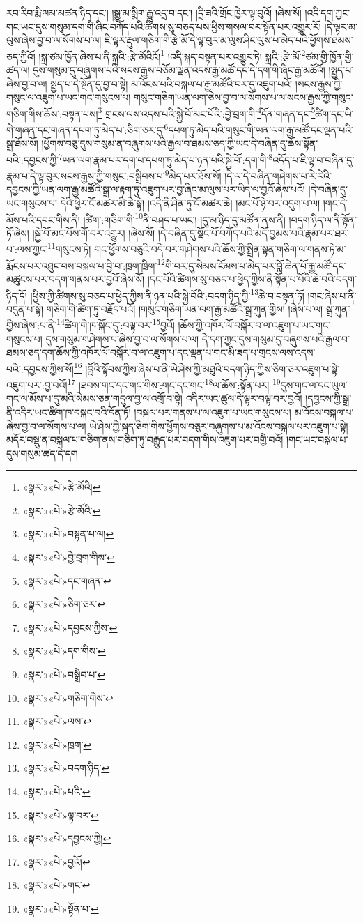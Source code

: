 རབ་རིབ་རྨི་ལམ་མཚན་ཉིད་དང་། །སྒྱུ་མ་སྨིག་རྒྱུ་འདྲ་བ་དང་། །དྲི་ཟའི་གྲོང་ཁྱེར་ལྟ་བུའོ། །ཞེས་སོ། །འདི་དག་ཀྱང་གང་ཡང་དུས་གསུམ་དག་གི་ཞིང་བཀོད་པའི་ཚིགས་སུ་བཅད་པས་ཕྱིས་གསལ་བར་སྟོན་པར་འགྱུར་རོ། །དེ་ལྟར་མ་ལུས་ཞེས་བྱ་བ་ལ་སོགས་པ་ལ། ཇི་ལྟར་རྡུལ་གཅིག་གི་རྩེ་མོ་དེ་ལྟ་བུར་མ་ལུས་ཤིང་ལུས་པ་མེད་པའི་ཕྱོགས་ཐམས་ཅད་ཀྱིའོ། །སྐྲ་ཙམ་ཁྱོན་ཞེས་པ་ནི་སྐྲའི་:རྩེ་མོའིའོ།\footnote{«སྣར་»«པེ་»རྩེ་མོའི།} །འདི་སྐད་བསྟན་པར་འགྱུར་ཏེ། སྐྲའི་:རྩེ་མོ་\footnote{«སྣར་»«པེ་»རྩེ་མོའི་}ཙམ་གྱི་ཁྱོན་གྱི་ཚད་ལ། དུས་གསུམ་དུ་བཞུགས་པའི་སངས་རྒྱས་བཅོམ་ལྡན་འདས་རྒྱ་མཚོ་དང་དེ་དག་གི་ཞིང་རྒྱ་མཚོའོ། །སྤྱད་པ་ཞེས་བྱ་བ་ལ། སྤྱད་པ་དེ་སྔོན་དུ་བྱ་བ་སྟེ། མ་འོངས་པའི་བསྐལ་པ་རྒྱ་མཚོའི་བར་དུ་འཇུག་པའོ། །སངས་རྒྱས་ཀྱི་གསུང་ལ་འཇུག་པ་ཡང་གང་གསུངས་པ། གསུང་གཅིག་ཡན་ལག་ཅེས་བྱ་བ་ལ་སོགས་པ་ལ་སངས་རྒྱས་ཀྱི་གསུང་གཅིག་གིས་ཆོས་:བསྟན་པས།\footnote{«སྣར་»«པེ་»བསྟན་པ་ལ།} གྲངས་ལས་འདས་པའི་སྐྱེ་བོ་མང་པོའི་:བྱེ་བྲག་གི་\footnote{«སྣར་»«པེ་»བྱེ་བྲག་གིས་}དོན་གཞན་དང་\footnote{«སྣར་»«པེ་»དང་གཞན་}ཚིག་དང་ཡི་གེ་གཞན་དང་གཞན་དཔག་ཏུ་མེད་པ་:ཅིག་ཅར་དུ་\footnote{«སྣར་»«པེ་»ཅིག་ཅར་}དཔག་ཏུ་མེད་པའི་གསུང་གི་ཡན་ལག་རྒྱ་མཚོ་དང་ལྡན་པའི་སྒྲ་ཐོས་སོ། །ཕྱོགས་བཅུ་དུས་གསུམ་ན་བཞུགས་པའི་རྒྱལ་བ་ཐམས་ཅད་ཀྱི་ཡང་དེ་བཞིན་དུ་ཆོས་སྟོན་པའི་:དབྱངས་ཀྱི་\footnote{«སྣར་»«པེ་»དབྱངས་ཀྱིས་}ཡན་ལག་རྣམ་པར་དག་པ་དཔག་ཏུ་མེད་པ་ཉན་པའི་སྐྱེ་བོ་:དག་གི་\footnote{«སྣར་»«པེ་»དག་གིས་}འདོད་པ་ཇི་ལྟ་བ་བཞིན་དུ་རྣམ་པ་དེ་ལྟ་བུར་སངས་རྒྱས་ཀྱི་གསུང་:བསྒྲིབས་པ་\footnote{«སྣར་»«པེ་»བསྒྲིབ་པ་}མེད་པར་ཐོས་སོ། །དེ་ལ་དེ་བཞིན་གཤེགས་པ་རེ་རེའི་དབྱངས་ཀྱི་ཡན་ལག་རྒྱ་མཚོའི་སྒྲ་ལ་རྟག་ཏུ་འཇུག་པར་བྱ་ཞིང་མ་ལུས་པར་ཡིད་ལ་བྱའོ་ཞེས་པའོ། །དེ་བཞིན་དུ་ཡང་གསུངས་པ། དེའི་ཕྱིར་ངོ་མཚར་མི་ཆེ་སྟེ། །འདི་ནི་ཤིན་ཏུ་ངོ་མཚར་ཆེ། །མང་པོ་ཉེ་བར་འདུག་པ་ལ། །གང་དེ་མོས་པའི་དབང་གིས་ནི། །ཚིག་:གཅིག་གི་\footnote{«སྣར་»«པེ་»གཅིག་གིས་}ནི་བཤད་པ་ཡང་། །དུ་མ་ཉིད་དུ་མཚོན་ནས་ནི། །བདག་ཉིད་ལ་ནི་སྟོན་ཏོ་ཞེས། །སྐྱེ་བོ་མང་པོས་གོ་བར་འགྱུར། །ཞེས་སོ། །དེ་བཞིན་དུ་སྡོང་པོ་བཀོད་པའི་མདོ་བྱམས་པའི་རྣམ་པར་ཐར་པ་:ལས་ཀྱང་\footnote{«སྣར་»«པེ་»ལས་}གསུངས་ཏེ། གང་ཕྱོགས་བཅུའི་བདེ་བར་གཤེགས་པའི་ཆོས་ཀྱི་སྤྲིན་སྟན་གཅིག་ལ་གནས་ཏེ་མ་རྨོངས་པར་འཐུང་བས་བསྐལ་པ་བྱེ་བ་:ཁྲག་ཁྲིག་\footnote{«སྣར་»«པེ་»ཁྲག་}གི་བར་དུ་སེམས་ངོམས་པ་མེད་པར་བློ་ཆེན་པོ་རྒྱ་མཚོ་དང་མཚུངས་པར་བདག་གནས་པར་བྱའོ་ཞེས་སོ། །དང་པོའི་ཚིགས་སུ་བཅད་པ་ཕྱེད་ཀྱིས་ནི་སྟོན་པ་པོའི་ཆེ་བའི་བདག་ཉིད་དོ། །ཕྱིས་ཀྱི་ཚིགས་སུ་བཅད་པ་ཕྱེད་ཀྱིས་ནི་ཉན་པའི་སྐྱེ་བོའི་:བདག་ཉིད་ཀྱི་\footnote{«སྣར་»«པེ་»བདག་ཉིད་}ཆེ་བ་བསྟན་ཏོ། །གང་ཞེས་པ་ནི་བདུན་པ་སྟེ། གཅིག་གི་ཚིག་ཏུ་བརྗོད་པའོ། །གསུང་གཅིག་ཡན་ལག་རྒྱ་མཚོའི་སྒྲ་ཀུན་གྱིས། །ཞེས་པ་ལ། སྒྲ་ཀུན་གྱིས་ཞེས་:པ་ནི་\footnote{«སྣར་»«པེ་»པའི་}ཚིག་གི་ཁ་སྐོང་དུ་:བལྟ་བར་\footnote{«སྣར་»«པེ་»ལྟ་བར་}བྱའོ། །ཆོས་ཀྱི་འཁོར་ལོ་བསྐོར་བ་ལ་འཇུག་པ་ཡང་གང་གསུངས་པ། དུས་གསུམ་གཤེགས་པ་ཞེས་བྱ་བ་ལ་སོགས་པ་ལ། དེ་དག་ཀྱང་དུས་གསུམ་དུ་བཞུགས་པའི་རྒྱལ་བ་ཐམས་ཅད་དག་ཆོས་ཀྱི་འཁོར་ལོ་བསྐོར་བ་ལ་འཇུག་པ་དང་ལྡན་པ་གང་མི་ཟད་པ་གྲངས་ལས་འདས་པའི་:དབྱངས་ཀྱིས་སོ།\footnote{«སྣར་»«པེ་»དབྱངས་ཀྱི།} །བློའི་སྟོབས་ཀྱིས་ཞེས་པ་ནི་ཡེ་ཤེས་ཀྱི་མཐུའི་བདག་ཉིད་ཀྱིས་ཅིག་ཅར་འཇུག་པ་སྟེ་འཇུག་པར་:བྱ་བའོ།\footnote{«སྣར་»«པེ་»བྱའོ།} །ཐབས་གང་དང་གང་གིས་:གང་དང་གང་\footnote{«སྣར་»«པེ་»གང་}ལ་ཆོས་:སྟོན་པར། \footnote{«སྣར་»«པེ་»སྟོན་པ་}དུས་གང་ལ་དང་ཡུལ་གང་ལ་མོས་པ་དུ་མའི་སེམས་ཅན་གདུལ་བྱ་ལ་འགྲོ་བ་སྟེ། འདིར་ཡང་ཚུལ་དེ་ལྟར་བལྟ་བར་བྱའོ། །དབྱངས་ཀྱི་སྒྲ་ནི་འདིར་ཡང་ཚིག་ཁ་བསྐང་བའི་དོན་ཏོ། །བསྐལ་པར་གནས་པ་ལ་འཇུག་པ་ཡང་གསུངས་པ། མ་འོངས་བསྐལ་པ་ཞེས་བྱ་བ་ལ་སོགས་པ་ལ། ཡེ་ཤེས་ཀྱི་སྐད་ཅིག་གིས་ཕྱོགས་བཅུར་བཞུགས་པ་མ་འོངས་བསྐལ་པར་འཇུག་པ་སྟེ། མདོར་བསྡུ་ན་བསྐལ་པ་གཅིག་ནས་གཅིག་ཏུ་བརྒྱུད་པར་བདག་གིས་འཇུག་པར་བགྱི་བའོ། །གང་ཡང་བསྐལ་པ་དུས་གསུམ་ཚད་དེ་དག 